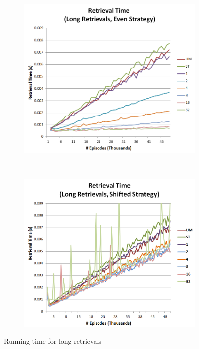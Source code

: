 \documentclass[11pt]{article} %
\begin{document}
\begin{figure}
        \centering
        \begin{subfigure}[b]{0.55\textwidth}
                \centering
                \includegraphics[width=\textwidth]{images/ret_long_eq}
                \label{fig:retleq}
        \end{subfigure}%
        ~ %
        \begin{subfigure}[b]{0.55\textwidth}
                \centering
                \includegraphics[width=\textwidth]{images/ret_long_shift}
                \label{fig:retlexp}
        \end{subfigure}
        \caption{Running time for long retrievals}\label{fig:long}
\end{figure}
\end{document}
